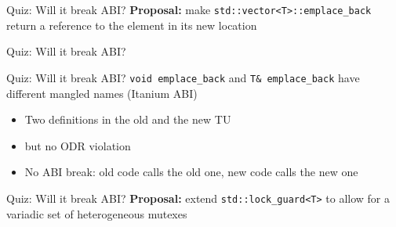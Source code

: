 \begin{frame}{Quiz: Will it break ABI?}
    \textbf{Proposal:} make \texttt{std::vector<T>::emplace\_back} return a reference to the element in its new location

    \vspace*{5mm}

    \centering


    \scalebox{2}{$\downarrow$}

\end{frame}

\begin{frame}[fragile]{Quiz: Will it break ABI?}
\end{frame}

\begin{frame}[fragile]{Quiz: Will it break ABI?}
    \texttt{void emplace\_back} and \texttt{T\& emplace\_back} have different mangled names (Itanium ABI)
    \begin{itemize}
        \item Two definitions in the old and the new TU
        \item but no ODR violation
        \item \textcolor{vertexDarkRed}{No ABI break:} old code calls the old one, new code calls the new one
    \end{itemize}
\end{frame}

\begin{frame}{Quiz: Will it break ABI?}
    \textbf{Proposal:} extend \texttt{std::lock\_guard<T>} to allow for a variadic set of heterogeneous mutexes

    \vspace*{5mm}

    \centering


    \scalebox{2}{$\downarrow$}

\end{frame}

